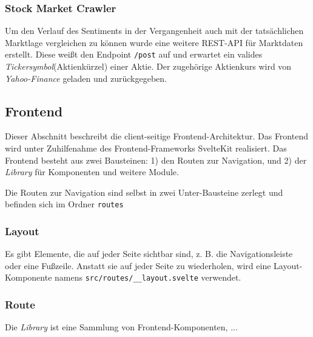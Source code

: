 \documentclass[a4paper, 10pt, conference]{IEEEtran}
\begin{document}
\subsubsection{Stock Market Crawler}

Um den Verlauf des Sentiments in der Vergangenheit auch mit der tatsächlichen Marktlage vergleichen zu können wurde eine weitere REST-API für Marktdaten erstellt. Diese weißt den Endpoint \texttt{/post} auf und erwartet ein valides \textit{Tickersymbol}(Aktienkürzel) einer Aktie. Der zugehörige Aktienkurs wird von \textit{Yahoo-Finance} geladen und zurückgegeben.

\subsection{Frontend} \label{sub:frontend}
Dieser Abschnitt beschreibt die client-seitige Frontend-Architektur. Das Frontend wird unter Zuhilfenahme des Frontend-Frameworks SvelteKit \cite{sveltekit} realisiert. Das Frontend besteht aus zwei Bausteinen: 1) den Routen zur Navigation, und 2) der \textit{Library} für Komponenten und weitere Module.

Die Routen zur Navigation sind selbst in zwei Unter-Bausteine zerlegt und befinden sich im Ordner \texttt{routes}

\subsubsection{Layout}

Es gibt Elemente, die auf jeder Seite sichtbar sind, z. B. die Navigationsleiste oder eine Fußzeile. Anstatt sie auf jeder Seite zu wiederholen,  wird eine Layout-Komponente namens \texttt{src/routes/\_\_layout.svelte} verwendet.

\subsubsection{Route}


Die \textit{Library} ist eine Sammlung von Frontend-Komponenten,  ...
\end{document}
